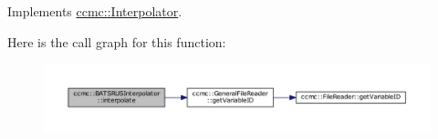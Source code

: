 Implements \hyperlink{classccmc_1_1_interpolator_ad5c1dd3693f83d75a2335b7c28cd649d}{ccmc\-::\-Interpolator}.



Here is the call graph for this function\-:\nopagebreak
\begin{figure}[H]
\begin{center}
\leavevmode
\includegraphics[width=350pt]{classccmc_1_1_b_a_t_s_r_u_s_interpolator_a9a9a185e83767d1bfc9b1bb584cd250f_cgraph}
\end{center}
\end{figure}


